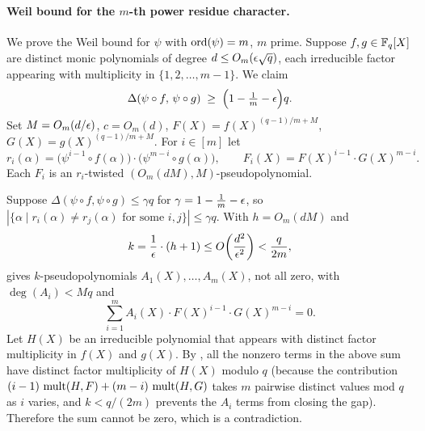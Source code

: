 \paragraph*{Weil bound for the $m$-th power residue character.}
We prove the Weil bound for $\psi$ with $\operatorname{ord}(\psi) = m$, $m$ prime. Suppose $f, g \in \mathbb{F}_q[X]$ are distinct monic polynomials of degree $d \leq O_m(\epsilon\sqrt{q})$, each irreducible factor appearing with multiplicity in $\{1, 2, \ldots, m-1\}$. We claim
\[
  \Delta(\psi \circ f,\, \psi \circ g) \;\geq\; \Bigl(1 - \tfrac{1}{m} - \epsilon\Bigr)q.
\]
Set $M = O_m(d/\epsilon)$, $c = O_m(d)$, $F(X) = f(X)^{(q-1)/m+M}$, $G(X) = g(X)^{(q-1)/m+M}$. For $i \in [m]$ let
\[
  r_i(\alpha) = \bigl(\psi^{i-1} \circ f(\alpha)\bigr)\cdot\bigl(\psi^{m-i} \circ g(\alpha)\bigr), \qquad
  F_i(X) = F(X)^{i-1}\cdot G(X)^{m-i}.
\]
Each $F_i$ is an $r_i$-twisted $(O_m(dM), M)$-pseudopolynomial.

Suppose $\Delta(\psi \circ f, \psi \circ g) \leq \gamma q$ for $\gamma = 1 - \frac{1}{m} - \epsilon$, so $|\{\alpha \mid r_i(\alpha) \neq r_j(\alpha)\text{ for some }i,j\}| \leq \gamma q$. With $h = O_m(dM)$ and
\[
  k = \frac{1}{\epsilon}\cdot(h+1) \leq O\!\left(\frac{d^2}{\epsilon^2}\right) < \frac{q}{2m},
\]
\TwistedRobustManythm gives $k$-pseudopolynomials $A_1(X), \ldots, A_m(X)$, not all zero, with $\deg(A_i) < Mq$ and
\[
  \sum_{i=1}^{m} A_i(X)\cdot F(X)^{i-1}\cdot G(X)^{m-i} = 0.
\]
Let $H(X)$ be an irreducible polynomial that appears with distinct factor multiplicity in $f(X)$ and $g(X)$. By \PdegMultBoundlem, all the nonzero terms in the above sum have distinct factor multiplicity of $H(X)$ modulo $q$ (because the contribution $(i-1)\,\operatorname{mult}(H,F)+(m-i)\,\operatorname{mult}(H,G)$ takes $m$ pairwise distinct values mod $q$ as $i$ varies, and $k < q/(2m)$ prevents the $A_i$ terms from closing the gap). Therefore the sum cannot be zero, which is a contradiction.

